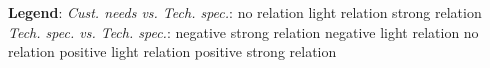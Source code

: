 \begin{table*}[p]
\begin{tabular}
    \scriptsize{\textbf{Legend}: \newline \scriptsize{\emph{Cust. needs vs. Tech. spec.}: \newline\point \hspace{1.5mm} no relation \newline\three \hspace{1.5mm} light relation \newline\nine \hspace{1.5mm} strong relation \newline \emph{Tech. spec. vs. Tech. spec.}: \newline\dwnin \hspace{1.5mm} negative strong relation \newline\dwthr \hspace{1.5mm} negative light relation \newline\point \hspace{1.5mm} no relation \newline\upthr \hspace{1.5mm} positive light relation \newline\upnin \hspace{1.5mm} positive strong relation}}


\end{tabular}
\end{table*}
